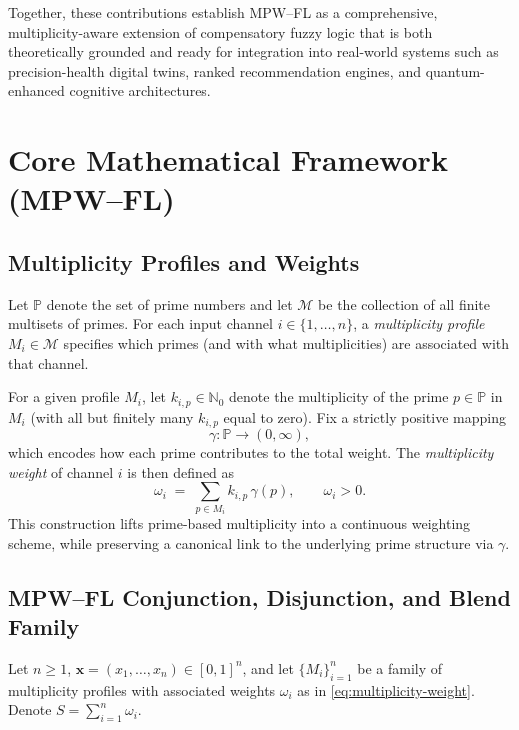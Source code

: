 \documentclass[11pt]{article}
\begin{document}
Together, these contributions establish MPW--FL as a comprehensive, multiplicity-aware extension of compensatory fuzzy logic that is both theoretically grounded and ready for integration into real-world systems such as precision-health digital twins, ranked recommendation engines, and quantum-enhanced cognitive architectures.

\section{Core Mathematical Framework (MPW--FL)}
\label{sec:core-framework}

\subsection{Multiplicity Profiles and Weights}
\label{subsec:multiplicity-weights}

Let $\mathbb{P}$ denote the set of prime numbers and let $\mathcal{M}$ be the collection of all finite multisets of primes. For each input channel $i \in \{1,\dots,n\}$, a \emph{multiplicity profile} $M_i \in \mathcal{M}$ specifies which primes (and with what multiplicities) are associated with that channel.

For a given profile $M_i$, let $k_{i,p} \in \mathbb{N}_0$ denote the multiplicity of the prime $p \in \mathbb{P}$ in $M_i$ (with all but finitely many $k_{i,p}$ equal to zero). Fix a strictly positive mapping
\[
  \gamma : \mathbb{P} \to (0,\infty),
\]
which encodes how each prime contributes to the total weight. The \emph{multiplicity weight} of channel $i$ is then defined as
\begin{equation}
  \omega_i \;=\; \sum_{p \in M_i} k_{i,p}\,\gamma(p), \qquad \omega_i > 0.
  \label{eq:multiplicity-weight}
\end{equation}
This construction lifts prime-based multiplicity into a continuous weighting scheme, while preserving a canonical link to the underlying prime structure via $\gamma$.

\subsection{MPW--FL Conjunction, Disjunction, and Blend Family}
\label{subsec:mpw-operators}

Let $n \ge 1$, $\mathbf{x} = (x_1,\dots,x_n) \in [0,1]^n$, and let $\{M_i\}_{i=1}^n$ be a family of multiplicity profiles with associated weights $\omega_i$ as in \eqref{eq:multiplicity-weight}. Denote $S = \sum_{i=1}^n \omega_i$.
\end{document}
